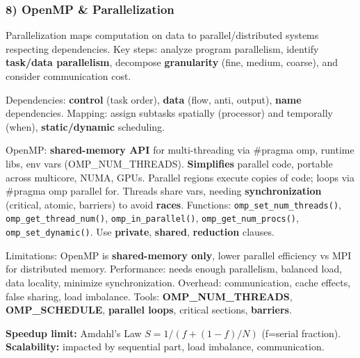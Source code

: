 \subsubsection*{8) OpenMP \& Parallelization}
Parallelization maps computation on data to parallel/distributed systems respecting dependencies. Key steps: analyze program parallelism, identify \textbf{task/data parallelism}, decompose \textbf{granularity} (fine, medium, coarse), and consider communication cost.

Dependencies: \textbf{control} (task order), \textbf{data} (flow, anti, output), \textbf{name} dependencies. Mapping: assign subtasks spatially (processor) and temporally (when), \textbf{static/dynamic} scheduling.

OpenMP: \textbf{shared-memory API} for multi-threading via \#pragma omp, runtime libs, env vars (OMP\_NUM\_THREADS). \textbf{Simplifies} parallel code, portable across multicore, NUMA, GPUs. Parallel regions execute copies of code; loops via \#pragma omp parallel for. Threads share vars, needing \textbf{synchronization} (critical, atomic, barriers) to avoid \textbf{races}. Functions: \texttt{omp\_set\_num\_threads()}, \texttt{omp\_get\_thread\_num()}, \texttt{omp\_in\_parallel()}, \texttt{omp\_get\_num\_procs()}, \texttt{omp\_set\_dynamic()}. Use \textbf{private}, \textbf{shared}, \textbf{reduction} clauses.

Limitations: OpenMP is \textbf{shared-memory only}, lower parallel efficiency vs MPI for distributed memory.
Performance: needs enough parallelism, balanced load, data locality, minimize synchronization.
Overhead: communication, cache effects, false sharing, load imbalance.
Tools: \textbf{OMP\_NUM\_THREADS}, \textbf{OMP\_SCHEDULE}, \textbf{parallel loops}, critical sections, \textbf{barriers}.

\textbf{Speedup limit:} Amdahl’s Law $S = 1 / (f + (1 - f) / N)$ (f=serial fraction). \textbf{Scalability:} impacted by sequential part, load imbalance, communication.
